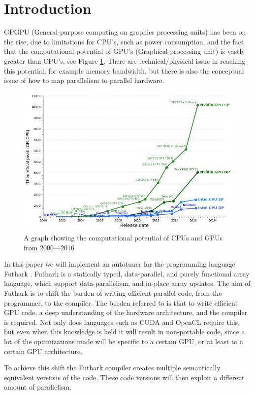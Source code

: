\section{Introduction}
GPGPU (General-purpose computing on graphics processing units) has been on the rise, due to limitations for CPU's, such as power consumption, and the fact that the computational potential of GPU's (Graphical processing unit) is vastly greater than CPU's, see Figure \ref{potential}. There are technical/physical issue in reaching this potential, for example memory bandwidth, but there is also the conceptual issue of how to map parallelism to parallel hardware.
\begin{figure}[h]
	\centering
	\includegraphics[width=.8\textwidth]{resources/graf.png}
	\caption{A graph showing the computational potential of CPUs and GPUs from 2000---2016 \cite{cpu-vs-gpu}}
	\label{potential}
\end{figure}

In this paper we will implement an autotuner for the programming language Futhark \cite{futhark-home}. Futhark is a statically typed, data-parallel, and purely functional array language, which support data-parallelism, and in-place array updates. The aim of Futhark is to shift the burden of writing efficient parallel code, from the programmer, to the compiler. The burden referred to is that to write efficient GPU code, a deep understanding of the hardware architecture, and the compiler is required. Not only does languages such as CUDA and OpenCL require this, but even when this knowledge is held it will result in non-portable code, since a lot of the optimizations made will be specific to a certain GPU, or at least to a certain GPU architecture. 

To achieve this shift the Futhark compiler creates multiple semantically equivalent versions of the code. These code versions will then exploit a different amount of parallelism.

